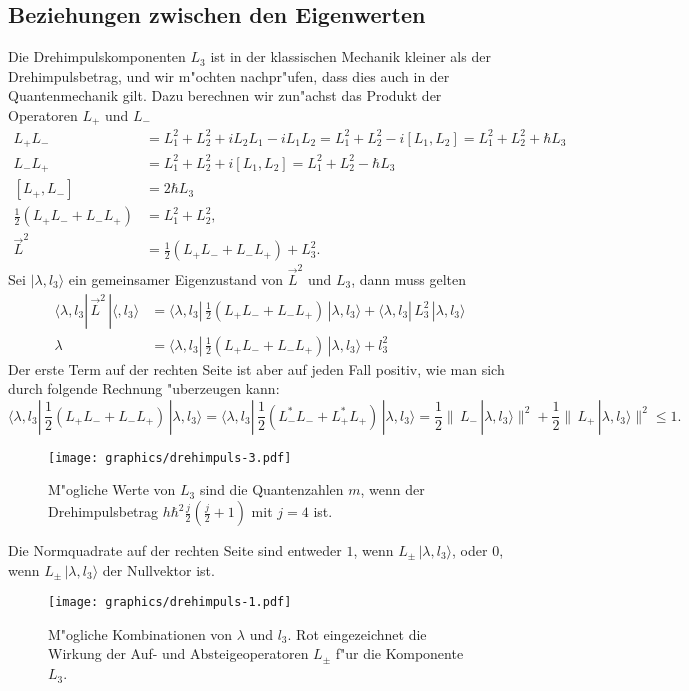 \subsection{Beziehungen zwischen den Eigenwerten}
Die Drehimpulskomponenten $L_3$ ist in der klassischen Mechanik kleiner
als der Drehimpulsbetrag, und wir m"ochten nachpr"ufen, dass dies auch
in der Quantenmechanik gilt.
Dazu berechnen wir zun"achst das Produkt der Operatoren $L_+$ und $L_-$
\begin{align*}
L_+L_-
&=
L_1^2+L_2^2 +iL_2L_1-iL_1L_2=L_1^2+L_2^2 -i[L_1,L_2]=L_1^2+L_2^2+\hbar L_3
\\
L_-L_+
&=
L_1^2  + L_2^2 +i[L_1,L_2]=L_1^2+L_2^2-\hbar L_3
\\
[L_+,L_-]
&=
2\hbar L_3
\\
{\textstyle \frac12}(L_+L_-+L_-L_+)&=L_1^2+L_2^2,
\\
\vec L^2
&=
{\textstyle\frac12}(L_+L_-+L_-L_+)+L_3^2.
\end{align*}
Sei $|\lambda,l_3\rangle$ ein gemeinsamer Eigenzustand von $\vec L^2$
und $L_3$, dann muss gelten
\begin{align*}
\langle \lambda,l_3|\,\vec L^2\,|\langle, l_3\rangle
&=
\langle \lambda,l_3|
\,
{\textstyle\frac12}(L_+L_-+L_-L_+)
\,
|\lambda,l_3\rangle
+
\langle \lambda,l_3|
\,
L_3^2
\,
|\lambda,l_3\rangle
\\
\lambda
&=
\langle \lambda,l_3|
\,
{\textstyle\frac12}(L_+L_-+L_-L_+)
\,
|\lambda,l_3\rangle
+
l_3^2
\end{align*}
Der erste Term auf der rechten Seite ist aber auf jeden Fall positiv,
wie man sich durch folgende Rechnung "uberzeugen kann:
\[
\langle \lambda,l_3|
\,
{\textstyle\frac12}(L_+L_-+L_-L_+)
\,
|\lambda,l_3\rangle
=
\langle \lambda,l_3|
\,
{\textstyle\frac12}(L_-^*L_-+L_+^*L_+)
\,
|\lambda,l_3\rangle
=
\frac12\|\,L_-\,|\lambda,l_3\rangle\|^2
+
\frac12\|\,L_+\,|\lambda,l_3\rangle\|^2
\le 1.
\]
\begin{figure}
\centering
\texttt{[image: graphics/drehimpuls-3.pdf]}
\caption{M"ogliche Werte von $L_3$ sind die Quantenzahlen $m$, wenn
der Drehimpulsbetrag $h\hbar^2 \frac{j}2(\frac{j}2+1)$ mit $j=4$ ist.
\label{drehimpulsrange}}
\end{figure}
Die Normquadrate auf der rechten Seite sind entweder $1$,
wenn $L_\pm\,|\lambda,l_3\rangle$, oder 0, wenn $L_\pm\,|\lambda,l_3\rangle$
der Nullvektor ist.
\begin{figure}
\centering
\texttt{[image: graphics/drehimpuls-1.pdf]}
\caption{M"ogliche Kombinationen von $\lambda$ und $l_3$. Rot eingezeichnet
die Wirkung der Auf- und Absteigeoperatoren $L_\pm$ f"ur die Komponente $L_3$.
\label{drehimpulsspektrum}}
\end{figure}
